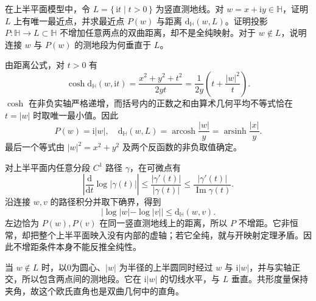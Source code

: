 \begin{exercise}[到测地线的最近点]\label{b3:ex:13-6}
在上半平面模型中，令 \(L=\{\,\mathrm i t\mid t>0\,\}\) 为竖直测地线。对 \(w=x+\mathrm i y\in\mathbb H\)，证明 \(L\) 上有唯一最近点，并求最近点 \(P(w)\) 与距离 \(\mathrm d_{\mathbb H}(w,L)\)。证明投影 \(P:\mathbb H\rightarrow L\subset\mathbb H\) 不增加任意两点的双曲距离，却不是全纯映射。对于 \(w\notin L\)，说明连接 \(w\) 与 \(P(w)\) 的测地段为何垂直于 \(L\)。
\end{exercise}
\begin{solution}
由距离公式，对 \(t>0\) 有
\[
 \cosh\mathrm d_{\mathbb H}(w,\mathrm i t)
 =\frac{x^2+y^2+t^2}{2yt}
 =\frac1{2y}\left(t+\frac{|w|^2}{t}\right).
\]
\(\cosh\) 在非负实轴严格递增，而括号内的正数之和由算术几何平均不等式恰在 \(t=|w|\) 时取唯一最小值。因此
\[
 P(w)=\mathrm i|w|,\quad
 \mathrm d_{\mathbb H}(w,L)
 =\operatorname{arcosh}\frac{|w|}{y}
 =\operatorname{arsinh}\frac{|x|}{y}.
\]
最后一个等式由 \(|w|^2=x^2+y^2\) 及两个反函数的非负取值确定。

对上半平面内任意分段 \(C^1\) 路径 \(\gamma\)，在可微点有
\[
 \left|\frac{\mathrm d}{\mathrm dt}\log|\gamma(t)|\right|
 \le\frac{|\gamma'(t)|}{|\gamma(t)|}
 \le\frac{|\gamma'(t)|}{\operatorname{Im}\gamma(t)}.
\]
沿连接 \(w,v\) 的路径积分并取下确界，得到
\[
 |\log|w|-\log|v||\le\mathrm d_{\mathbb H}(w,v).
\]
左边恰为 \(P(w),P(v)\) 在同一竖直测地线上的距离，所以 \(P\) 不增距。它非恒常，却把整个上半平面映入没有内部的虚轴；若它全纯，就与开映射定理矛盾。因此不增距条件本身不能反推全纯性。

当 \(w\notin L\) 时，以0为圆心、\(|w|\) 为半径的上半圆同时经过 \(w\) 与 \(\mathrm i|w|\)，并与实轴正交，所以包含两点间的测地段。它在 \(\mathrm i|w|\) 的切线水平，与 \(L\) 垂直。共形度量保持夹角，故这个欧氏直角也是双曲几何中的直角。
\end{solution}

